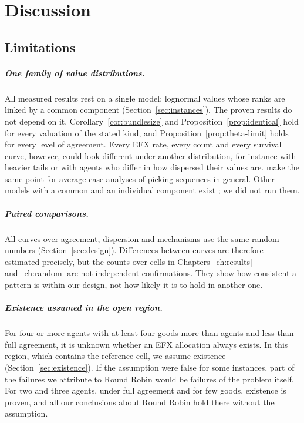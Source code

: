 \chapter{Discussion}\label{ch:discussion}

\section{Limitations}\label{sec:limitations}

\paragraph{One family of value distributions.}
All measured results rest on a single model: lognormal values whose ranks are linked by a common
component (Section~\ref{sec:instances}). The proven results do not depend on it.
Corollary~\ref{cor:bundlesize} and Proposition~\ref{prop:identical} hold for every valuation of the
stated kind, and Proposition~\ref{prop:theta-limit} holds for every level of agreement. Every EFX
rate, every count and every survival curve, however, could look different under another
distribution, for instance with heavier tails or with agents who differ in how dispersed their
values are. \textcite[Conclusion]{celine2026} make the same point for average case analyses of
picking sequences in general. Other models with a common and an individual component exist
\parencite{dickerson2014,branzei2025}; we did not run them.

\paragraph{Paired comparisons.}
All curves over agreement, dispersion and mechanisms use the same random numbers
(Section~\ref{sec:design}). Differences between curves are therefore estimated precisely, but the
counts over cells in Chapters~\ref{ch:results} and~\ref{ch:random} are not independent
confirmations. They show how consistent a pattern is within our design, not how likely it is to
hold in another one.

\paragraph{Existence assumed in the open region.}
For four or more agents with at least four goods more than agents and less than full agreement, it
is unknown whether an EFX allocation always exists. In this region, which contains the reference
cell, we assume existence (Section~\ref{sec:existence}). If the assumption were false for some
instances, part of the failures we attribute to Round Robin would be failures of the problem
itself. For two and three agents, under full agreement and for few goods, existence is proven, and
all our conclusions about Round Robin hold there without the assumption.

